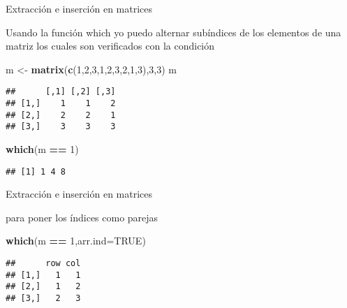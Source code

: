 \documentclass[ignorenonframetext,]{beamer}
\newenvironment{Shaded}{\begin{snugshade}}{\end{snugshade}}
\newcommand{\KeywordTok}[1]{\textcolor[rgb]{0.13,0.29,0.53}{\textbf{#1}}}
\newcommand{\DataTypeTok}[1]{\textcolor[rgb]{0.13,0.29,0.53}{#1}}
\newcommand{\DecValTok}[1]{\textcolor[rgb]{0.00,0.00,0.81}{#1}}
\newcommand{\StringTok}[1]{\textcolor[rgb]{0.31,0.60,0.02}{#1}}
\newcommand{\OtherTok}[1]{\textcolor[rgb]{0.56,0.35,0.01}{#1}}
\newcommand{\OperatorTok}[1]{\textcolor[rgb]{0.81,0.36,0.00}{\textbf{#1}}}
\newcommand{\NormalTok}[1]{#1}
\begin{document}
\begin{frame}[fragile]{Extracción e inserción en matrices}

Usando la función which yo puedo alternar subíndices de los elementos de
una matriz los cuales son verificados con la condición

\begin{Shaded}
\begin{Highlighting}[]
\NormalTok{m <-}\StringTok{ }\KeywordTok{matrix}\NormalTok{(}\KeywordTok{c}\NormalTok{(}\DecValTok{1}\NormalTok{,}\DecValTok{2}\NormalTok{,}\DecValTok{3}\NormalTok{,}\DecValTok{1}\NormalTok{,}\DecValTok{2}\NormalTok{,}\DecValTok{3}\NormalTok{,}\DecValTok{2}\NormalTok{,}\DecValTok{1}\NormalTok{,}\DecValTok{3}\NormalTok{),}\DecValTok{3}\NormalTok{,}\DecValTok{3}\NormalTok{)}
\NormalTok{m}
\end{Highlighting}
\end{Shaded}
\pause
\begin{verbatim}
##      [,1] [,2] [,3]
## [1,]    1    1    2
## [2,]    2    2    1
## [3,]    3    3    3
\end{verbatim}

\begin{Shaded}
\begin{Highlighting}[]
\KeywordTok{which}\NormalTok{(m }\OperatorTok{==}\StringTok{ }\DecValTok{1}\NormalTok{)}
\end{Highlighting}
\end{Shaded}
\pause
\begin{verbatim}
## [1] 1 4 8
\end{verbatim}

\end{frame}

\begin{frame}[fragile]{Extracción e inserción en matrices}

para poner los índices como parejas

\begin{Shaded}
\begin{Highlighting}[]
\KeywordTok{which}\NormalTok{(m }\OperatorTok{==}\StringTok{ }\DecValTok{1}\NormalTok{,}\DataTypeTok{arr.ind=}\OtherTok{TRUE}\NormalTok{)}
\end{Highlighting}
\end{Shaded}
\pause
\begin{verbatim}
##      row col
## [1,]   1   1
## [2,]   1   2
## [3,]   2   3
\end{verbatim}

\end{frame}
\end{document}
